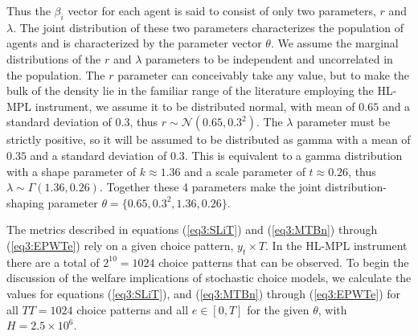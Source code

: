 \documentclass[../main.tex]{subfiles}
\begin{document}
\noindent Thus the $\beta_i$ vector for each agent is said to consist of only two parameters, $r$ and $\lambda$.
The joint distribution of these two parameters characterizes the population of agents and is characterized by the parameter vector $\theta$.
We assume the marginal distributions of the $r$ and $\lambda$ parameters to be independent and uncorrelated in the population.{\footnotemark}
The $r$ parameter can conceivably take any value, but to make the bulk of the density lie in the familiar range of the literature employing the HL-MPL instrument, we assume it to be distributed normal, with mean of $0.65$ and a standard deviation of $0.3$, thus $r \sim \mathcal{N}(0.65 , 0.3^2 )$.
The $\lambda$ parameter must be strictly positive, so it will be assumed to be distributed as gamma with a mean of $0.35$ and a standard deviation of $0.3$.
This is equivalent to a gamma distribution with a shape parameter of $k \approx 1.36$ and a scale parameter of $t\approx0.26$, thus $\lambda \sim \Gamma(1.36 , 0.26)$.
Together these 4 parameters make the joint distribution-shaping parameter $\theta=\{0.65 ,0.3^2, 1.36 , 0.26\}$.

The metrics described in equations (\ref{eq3:SLiT}) and (\ref{eq3:MTBn}) through (\ref{eq3:EPWTe}) rely on a given choice pattern, $y_t \times T$.
In the HL-MPL instrument there are a total of $2^{10}=1024$ choice patterns that can be observed.
To begin the discussion of the welfare implications of stochastic choice models, we calculate the values for equations (\ref{eq3:SLiT}), and (\ref{eq3:MTBn}) through (\ref{eq3:EPWTe}) for all $\mathit{TT} =1024$ choice patterns and all $e \in[0,T]$ for the given $\theta$, with $H=2.5 \times 10^6$.{\footnotemark}


\end{document}
